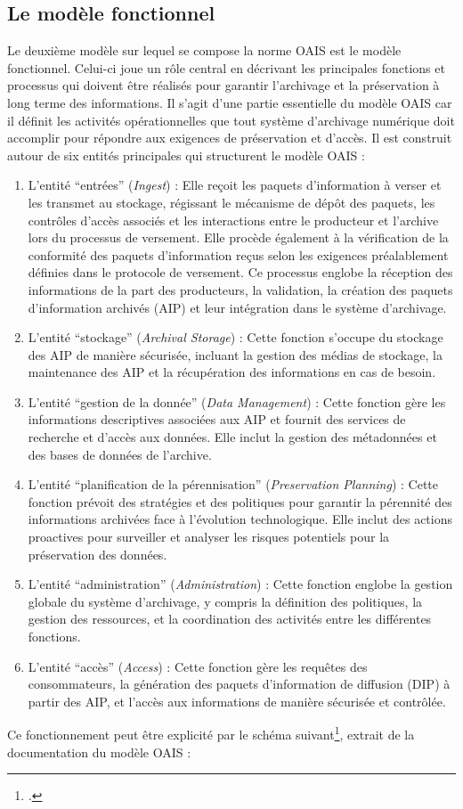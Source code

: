 \subsection{Le modèle fonctionnel}
Le deuxième modèle sur lequel se compose la norme \gls{OAIS} est le modèle fonctionnel. Celui-ci joue un rôle central en décrivant les principales fonctions et processus qui doivent être réalisés pour garantir l'archivage et la préservation à long terme des informations. Il s'agit d'une partie essentielle du modèle \gls{OAIS} car il définit les activités opérationnelles que tout système d'archivage numérique doit accomplir pour répondre aux exigences de préservation et d'accès. Il est construit autour de six entités principales qui structurent le modèle \gls{OAIS} : 
\begin{enumerate}
	\item L’entité \enquote{entrées} (\textit{Ingest}) : Elle reçoit les paquets d'information à verser et les transmet au stockage, régissant le mécanisme de dépôt des paquets, les contrôles d'accès associés et les interactions entre le producteur et l'archive lors du processus de versement. Elle procède également à la vérification de la conformité des paquets d'information reçus selon les exigences préalablement définies dans le protocole de versement. Ce processus englobe la réception des informations de la part des producteurs, la validation, la création des paquets d’information archivés (\gls{AIP}) et leur intégration dans le système d'archivage.
	\item L’entité \enquote{stockage} (\textit{Archival Storage}) : Cette fonction s'occupe du stockage des \gls{AIP} de manière sécurisée, incluant la gestion des médias de stockage, la maintenance des \gls{AIP} et la récupération des informations en cas de besoin.
	\item L’entité \enquote{gestion de la donnée} (\textit{Data Management}) : Cette fonction gère les informations descriptives associées aux \gls{AIP} et fournit des services de recherche et d'accès aux données. Elle inclut la gestion des métadonnées et des bases de données de l'archive.
	\item L’entité \enquote{planification de la pérennisation} (\textit{Preservation Planning}) : Cette fonction prévoit des stratégies et des politiques pour garantir la pérennité des informations archivées face à l'évolution technologique. Elle inclut des actions proactives pour surveiller et analyser les risques potentiels pour la préservation des données.
	\item L’entité \enquote{administration} (\textit{Administration}) : Cette fonction englobe la gestion globale du système d'archivage, y compris la définition des politiques, la gestion des ressources, et la coordination des activités entre les différentes fonctions.
	\item L’entité \enquote{accès} (\textit{Access}) : Cette fonction gère les requêtes des consommateurs, la génération des paquets d'information de diffusion (\gls{DIP}) à partir des \gls{AIP}, et l'accès aux informations de manière sécurisée et contrôlée.
\end{enumerate}
Ce fonctionnement peut être explicité par le schéma suivant\footcite[p.44]{noauthor_reference_2012}, extrait de la documentation du modèle \gls{OAIS} :
